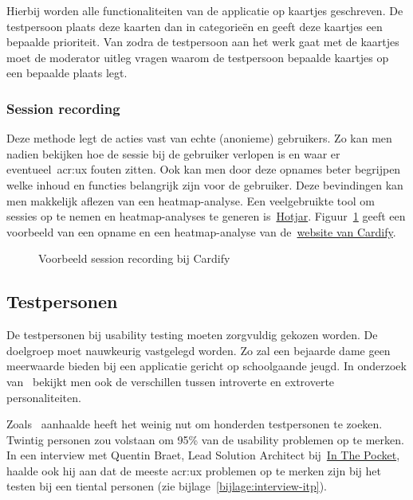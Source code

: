 Hierbij worden alle functionaliteiten van de applicatie op kaartjes geschreven. De testpersoon plaats deze kaarten dan in categorieën en geeft deze kaartjes een bepaalde prioriteit. Van zodra de testpersoon aan het werk gaat met de kaartjes moet de moderator uitleg vragen waarom de testpersoon bepaalde kaartjes op een bepaalde plaats legt. 

\subsubsection{Session recording}
\label{sec:usability-testing:testmethoden:session-recording}

Deze methode legt de acties vast van echte (anonieme) gebruikers. Zo kan men nadien bekijken hoe de sessie bij de gebruiker verlopen is en waar er eventueel~\acrlong{acr:ux} fouten zitten. Ook kan men door deze opnames beter begrijpen welke inhoud en functies belangrijk zijn voor de gebruiker. Deze bevindingen kan men makkelijk aflezen van een heatmap-analyse. Een veelgebruikte tool om sessies op te nemen en heatmap-analyses te generen is~\href{https://www.hotjar.com/}{Hotjar}. Figuur~\ref{fig:testing-hotjar} geeft een voorbeeld van een opname en een heatmap-analyse van de~\href{https://getcardify.com/}{website van Cardify}.

\begin{figure}
    \centering
    \qquad
    \caption[Voorbeeld session recording]{Voorbeeld session recording bij Cardify}
    \label{fig:testing-hotjar}
\end{figure}

\subsection{Testpersonen}
\label{sec:usability-testing:testpersonen}

De testpersonen bij usability testing moeten zorgvuldig gekozen worden. De doelgroep moet nauwkeurig vastgelegd worden. Zo zal een bejaarde dame geen meerwaarde bieden bij een applicatie gericht op schoolgaande jeugd. In onderzoek van~\textcite{Alnashri2016} bekijkt men ook de verschillen tussen introverte en extroverte personaliteiten.

Zoals~\textcite{Faulkner2003} aanhaalde heeft het weinig nut om honderden testpersonen te zoeken. Twintig personen zou volstaan om 95\% van de usability problemen op te merken. In een interview met Quentin Braet, Lead Solution Architect bij~\href{https://www.inthepocket.com/}{In The Pocket}, haalde ook hij aan dat de meeste \acrshort{acr:ux} problemen op te merken zijn bij het testen bij een tiental personen (zie bijlage~\ref{bijlage:interview-itp}).

